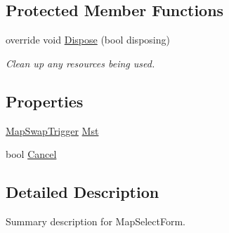 \subsection*{Protected Member Functions}
\begin{DoxyCompactItemize}
\item 
override void \hyperlink{class_s_e_a_r_c_h_1_1frm_map_select_form_a7c0894ccbaf77f3e1a20f6513b22e899}{Dispose} (bool disposing)
\begin{DoxyCompactList}\small\item\em Clean up any resources being used. \end{DoxyCompactList}\end{DoxyCompactItemize}
\subsection*{Properties}
\begin{DoxyCompactItemize}
\item 
\hyperlink{class_s_e_a_r_c_h_1_1_map_swap_trigger}{Map\-Swap\-Trigger} \hyperlink{class_s_e_a_r_c_h_1_1frm_map_select_form_a340701db8706e8a0921814d0d4bccf42}{Mst}
\item 
bool \hyperlink{class_s_e_a_r_c_h_1_1frm_map_select_form_afa13153f55d301ef1db46eeabc5a4a00}{Cancel}
\end{DoxyCompactItemize}


\subsection{Detailed Description}
Summary description for Map\-Select\-Form. 




